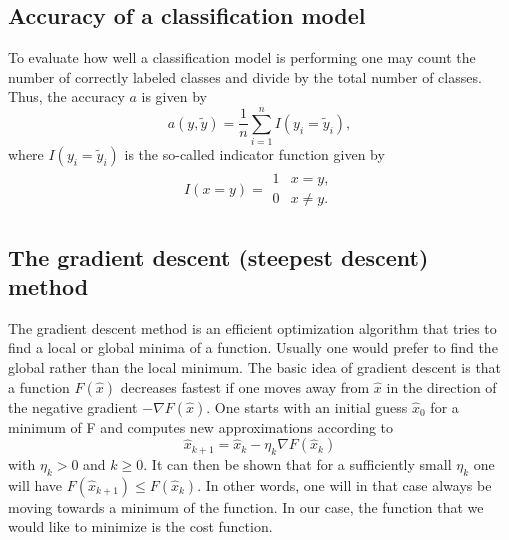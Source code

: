 \documentclass[a4paper,12pt]{article}
\begin{document}
\subsection{Accuracy of a classification model}
To evaluate how well a classification model is performing one may count the number of correctly labeled classes and divide by the total number of classes. Thus, the accuracy $a$ is given by
\begin{equation}
    a(y,\tilde{y}) = \frac{1}{n}\sum_{i=1}^n I(y_i = \tilde{y}_i),
\end{equation}
where $I(y_i = \tilde{y}_i)$ is the so-called indicator function given by
\begin{align}
    I(x = y) = \begin{array}{cc}
    1 & x = y, \\
    0 & x \neq y.
    \end{array}
\end{align}


\subsection{The gradient descent (steepest descent) method}
The gradient descent method is an efficient optimization algorithm that tries to find a local or global minima of a function. Usually one would prefer to find the global rather than the local minimum. The basic idea of gradient descent is that a function $F(\hat{x})$ decreases fastest if one moves away from $\hat{x}$ in the direction of the negative gradient $-\nabla F(\hat{x})$.\newline
One starts with an initial guess $\hat{x}_0$ for a minimum of F and computes new approximations according to
\begin{equation}
    \hat{x}_{k+1} = \hat{x}_k - \eta_k \nabla F(\hat{x}_k)
\end{equation}
with $\eta_k > 0$ and $k \geq 0$. It can then be shown that for a sufficiently small $\eta_k$ one will have $F(\hat{x}_{k+1}) \leq F(\hat{x}_k)$. In other words, one will in that case always be moving towards a minimum of the function.\newline
In our case, the function that we would like to minimize is the cost function.\newline
\end{document}
